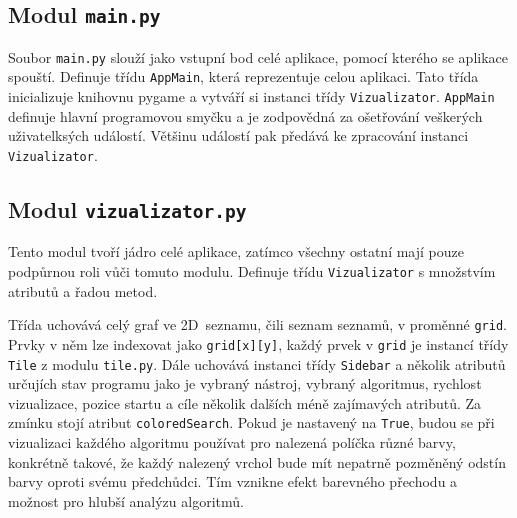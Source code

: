 \documentclass[12pt]{report}			%
\begin{document}
			\subsection{Modul \texttt{main.py}}
			Soubor \texttt{main.py} slouží jako vstupní bod celé aplikace, pomocí kterého se aplikace spouští. Definuje třídu \texttt{AppMain}, která reprezentuje celou aplikaci. Tato třída inicializuje knihovnu pygame a vytváří si instanci třídy \texttt{Vizualizator}. \texttt{AppMain} definuje hlavní programovou smyčku a je zodpovědná za ošetřování veškerých uživatelksých událostí. Většinu událostí pak předává ke zpracování instanci \texttt{Vizualizator}. 

			\subsection{Modul \texttt{vizualizator.py}}
			Tento modul tvoří jádro celé aplikace, zatímco všechny ostatní mají pouze podpůrnou roli vůči tomuto modulu.
			Definuje třídu \texttt{Vizualizator} s množstvím atributů a řadou metod. 
			
			Třída uchovává celý graf ve 2D~seznamu, čili seznam seznamů, v proměnné \texttt{grid}. Prvky v něm lze indexovat jako \texttt{grid[x][y]}, každý prvek v \texttt{grid} je instancí třídy \texttt{Tile} z modulu \texttt{tile.py}. Dále uchovává instanci třídy \texttt{Sidebar} a několik atributů určujích stav programu jako je vybraný nástroj, vybraný algoritmus, rychlost vizualizace, pozice startu a cíle několik dalších méně zajímavých atributů. Za zmínku stojí atribut \texttt{coloredSearch}. %
			Pokud je nastavený na \texttt{True}, budou se při vizualizaci každého algoritmu používat pro nalezená políčka různé barvy, konkrétně takové, že každý nalezený vrchol bude mít nepatrně pozměněný odstín barvy oproti svému předchůdci. Tím vznikne efekt barevného přechodu a možnost pro hlubší analýzu algoritmů.
			
\end{document}
